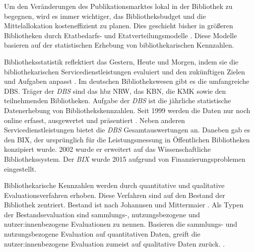 Um den Veränderungen des Publikationsmarktes lokal in der Bibliothek zu begegnen, wird es immer wichtiger, das Bibliotheksbudget und die Mittelallokation kosteneffizient zu planen. 
Dies geschieht bisher in größeren Bibliotheken durch Etatbedarfs- und Etatverteilungsmodelle \cite[Vgl.][172 ff.]{moravetz-kuhlmann_monika_erwerbungspolitik_2015}.
Diese Modelle basieren auf der statistischen Erhebung von bibliothekarischen Kennzahlen.

Bibliotheksstatistik reflektiert das Gestern, Heute und Morgen, indem 
sie die bibliothekarischen Servicedienstleistungen evaluiert und den zukünftigen Zielen und Aufgaben anpasst \cites[Vgl.][2 f.]{jilovsky_cathie_library_2004}[Vgl.][462]{laitinen_markku_library_2013}.
Im deutschen Bibliothekswesen gibt es die umfangreiche \acrfull{DBS}. 
Träger der \textit{\acrshort{DBS}} sind das \acrfull{hbz NRW},  das \acrfull{KBN}, die \acrfull{KMK} sowie den teilnehmenden Bibliotheken.
Aufgabe der \textit{\acrshort{DBS}} ist die jährliche statistische Datenerhebung von Bibliothekskennzahlen. 
Seit 1999 werden die Daten nur noch online erfasst, ausgewertet und präsentiert \cite[Vgl.][2]{schmidt_deutsche_2008}.
Neben anderen Servicedienstleistungen bietet die \textit{\acrshort{DBS}} Gesamtauswertungen an.
Daneben gab es den \acrfull{BIX}, der ursprünglich für die Leistungsmessung in Öffentlichen Bibliotheken konzipiert wurde. 
2002 wurde er erweitert auf das Wissenschaftliche Bibliothekssystem. Der \textit{\acrshort{BIX}} wurde 2015 aufgrund von Finanzierungsproblemen eingestellt. 

Bibliothekarische Kennzahlen werden durch quantitative und qualitative Evaluationsverfahren erhoben. Diese Verfahren
sind auf den Bestand der Bibliothek zentriert. 
Bestand ist nach Johannsen und Mittermaier
 \cite[252]{johannsen_jochen_bestands-_2015}.
Als Typen der Bestandsevaluation sind sammlungs-, nutzungsbezogene und nutzer:innenbezogene Evaluationen zu nennen.\cite[Vgl.][302]{johnson_peggy_fundamentals_2014}
Basieren die sammlungs- und nutzungsbezogene Evaluation auf quantitativen Daten, greift die nutzer:innenbezogene Evaluation zumeist auf qualitative Daten zurück. 
\cite[Vgl.][461 ff.]{blake_data_2004}.

